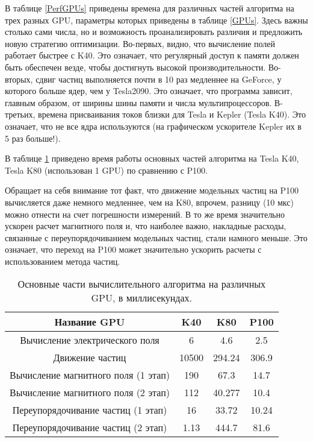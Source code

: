 В таблице \ref {PerfGPUs} приведены времена для различных частей алгоритма на трех разных GPU, параметры которых приведены в таблице \ref{GPUs}. Здесь важны столько сами числа, но и возможность проанализировать различия и предложить новую стратегию оптимизации. Во-первых, видно, что вычисление полей работает быстрее с K40. Это означает, что регулярный доступ к памяти должен быть обеспечен везде, чтобы достигнуть высокой производительности. Во-вторых, сдвиг частиц выполняется почти в 10 раз медленнее на  GeForce, у которого больше ядер, чем у Tesla2090. Это означает, что программа зависит, главным образом, от ширины шины памяти
и числа мультипроцессоров. В-третьих, времена присваивания токов  близки для Tesla и Kepler (Tesla K40). Это означает, что не все ядра используются (на графическом ускорителе Kepler их в 5 раз больше!).

В таблице \ref{tabP100} приведено время работы основных частей алгоритма на Tesla K40, Tesla K80 (использован 1 GPU) по сравнению с P100.

Обращает на себя внимание тот факт, что движение модельных частиц на P100 вычисляется даже немного медленнее, чем на K80, впрочем, разницу (10 мкс) можно отнести на счет погрешности измерений. В то же время значительно ускорен расчет магнитного поля и, что наиболее важно, накладные расходы, связанные с переупорядочиванием модельных частиц, стали намного меньше. Это означает, что  переход на P100 может значительно ускорить расчеты с использованием метода частиц.

\begin{table}[ht]
	\caption{ Основные части вычислительного алгоритма на различных GPU, в миллисекундах.}
	\begin{center}
		\begin{tabular}{|c|c|c|c|}
			\hline
			Название GPU & K40 & K80 & P100\\\hline
			Вычисление электрического поля      & 6    & 4.6     & 2.5    \\\hline
			Движение частиц                     &10500 & 294.24  & 306.9  \\\hline
			Вычисление магнитного поля (1 этап) & 190  & 67.3    & 14.7   \\\hline
			Вычисление магнитного поля (2 этап) & 112  & 40.277  & 10.4   \\ \hline
			Переупорядочивание частиц (1 этап)  & 16   & 33.72   & 10.24  \\ \hline
			Переупорядочивание частиц (2 этап)  & 1.13 & 444.7   & 81.6       \\ \hline
		\end{tabular}
	\end{center}
	\label{tabP100}
\end{table}


